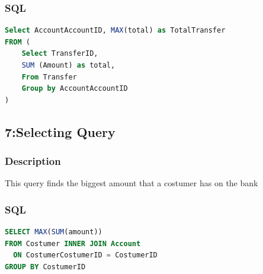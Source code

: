 \documentclass[a4paper, 10pt]{article}
\begin{document}
\subsubsection{SQL}
\begin{lstlisting}[language=SQL]
Select AccountAccountID, MAX(total) as TotalTransfer
FROM (
	Select TransferID,
	SUM (Amount) as total,
	From Transfer
	Group by AccountAccountID
)
\end{lstlisting}

\subsection{7:Selecting Query}
\subsubsection{Description}
This query finds the biggest amount that a costumer has on the bank
\subsubsection{SQL}
\begin{lstlisting}[language=SQL]
SELECT MAX(SUM(amount))
FROM Costumer INNER JOIN Account 
  ON CostumerCostumerID = CostumerID
GROUP BY CostumerID
\end{lstlisting}
\end{document}
